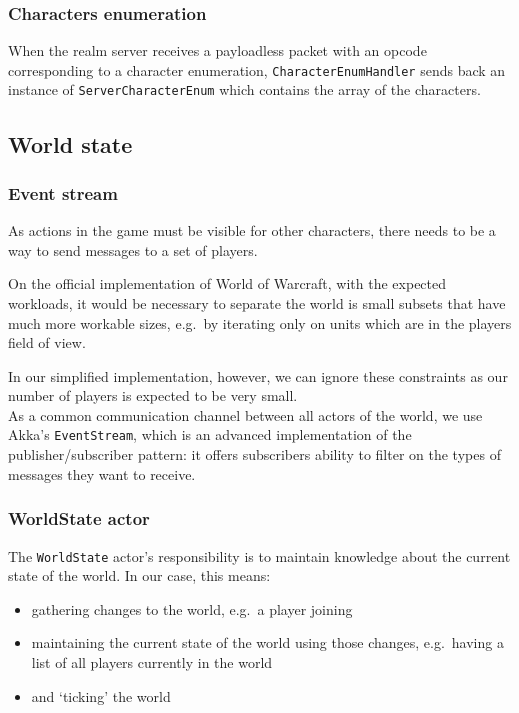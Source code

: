 \documentclass[paper=a4, fontsize=11pt]{scrartcl}
\begin{document}
\subsubsection{Characters enumeration}
When the realm server receives a payloadless packet with an opcode corresponding
to a character enumeration, \texttt{CharacterEnumHandler} sends back an instance
of \texttt{ServerCharacterEnum} which contains the array of the characters.

\subsection{World state}

\subsubsection{Event stream}

As actions in the game must be visible for other characters, there needs to
be a way to send messages to a set of players.

On the official implementation of World of Warcraft, with the expected
workloads, it would be necessary to separate the world is small subsets that have
much more workable sizes, e.g.\ by iterating only on units which are in the
players field of view.

In our simplified implementation, however, we can ignore these constraints as
our number of players is expected to be very small.\\

As a common communication channel between all actors of the world, we use Akka's
\texttt{EventStream}, which is an advanced implementation of the
publisher/subscriber pattern: it offers subscribers ability to filter on the
types of messages they want to receive.

\subsubsection{WorldState actor}

The \texttt{WorldState} actor's responsibility is to maintain knowledge about
the current state of the world.
In our case, this means:
\begin{itemize}
    \item gathering changes to the world, e.g.\ a player joining
    \item maintaining the current state of the world using those changes, e.g.\
        having a list of all players currently in the world
    \item and `ticking' the world
\end{itemize}
\end{document}
